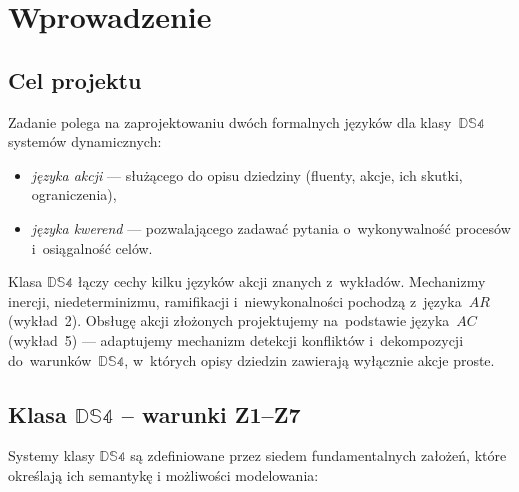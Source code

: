 \documentclass[11pt,a4paper]{article}
\theoremstyle{definition}
\begin{document}
\section{Wprowadzenie}

\subsection{Cel projektu}

Zadanie polega na zaprojektowaniu dwóch formalnych języków dla klasy~$\mathbb{DS4}$
systemów dynamicznych:
\begin{itemize}
  \item \emph{języka akcji} --- służącego do opisu dziedziny (fluenty, akcje,
        ich skutki, ograniczenia),
  \item \emph{języka kwerend} --- pozwalającego zadawać pytania o~wykonywalność
        procesów i~osiągalność celów.
\end{itemize}

Klasa $\mathbb{DS4}$ łączy cechy kilku języków akcji znanych z~wykładów.
Mechanizmy inercji, niedeterminizmu, ramifikacji i~niewykonalności
pochodzą z~języka~$AR$ (wykład~2). Obsługę akcji złożonych projektujemy
na~podstawie języka~$AC$ (wykład~5) --- adaptujemy mechanizm detekcji
konfliktów i~dekompozycji do~warunków~$\mathbb{DS4}$,
w~których opisy dziedzin zawierają wyłącznie akcje proste.

\subsection{Klasa \texorpdfstring{$\mathbb{DS4}$}{DS4} -- warunki Z1--Z7}
Systemy klasy $\mathbb{DS4}$ są zdefiniowane przez siedem fundamentalnych założeń, które określają ich semantykę i możliwości modelowania:
\end{document}
